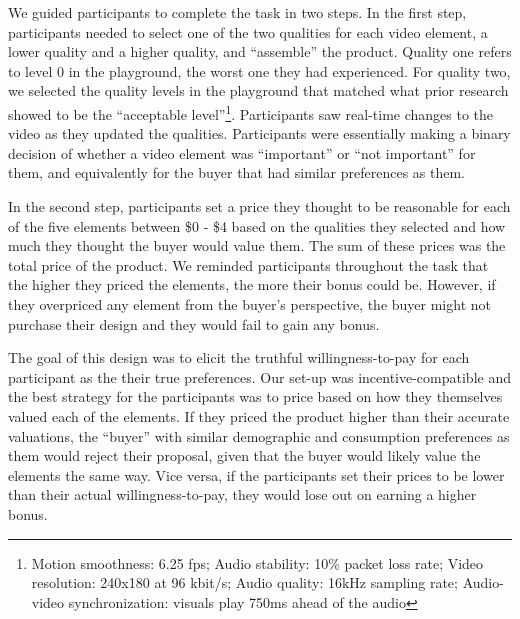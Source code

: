 We guided participants to complete the task in two steps.  In the first step, participants needed to select one of the two qualities for each video element, a lower quality and a higher quality, and ``assemble'' the product. Quality one refers to level 0 in the playground, the worst one they had experienced. For quality two, we selected the quality levels in the playground that matched what prior research showed to be the ``acceptable level''\footnote{Motion smoothness: 6.25 fps; Audio stability: 10\% packet loss rate; Video resolution: 240x180 at 96 kbit/s; Audio quality: 16kHz sampling rate; Audio-video synchronization: visuals play 750ms ahead of the audio}. Participants saw real-time changes to the video as they updated the qualities. Participants were essentially making a binary decision of whether a video element was ``important'' or ``not important'' for them, and equivalently for the buyer that had similar preferences as them. 

In the second step, participants set a price they thought to be reasonable for each of the five elements between \$0 - \$4 based on the qualities they selected and how much they thought the buyer would value them. The sum of these prices was the total price of the product. We reminded participants throughout the task that the higher they priced the elements, the more their bonus could be. However, if they overpriced any element from the buyer's perspective, the buyer might not purchase their design and they would fail to gain any bonus. 

The goal of this design was to elicit the truthful willingness-to-pay for each participant as the their true preferences. Our set-up was incentive-compatible and the best strategy for the participants was to price based on how they themselves valued each of the elements. If they priced the product higher than their accurate valuations, the ``buyer'' with similar demographic and consumption preferences as them would reject their proposal, given that the buyer would likely value the elements the same way. Vice versa, if the participants set their prices to be lower than their actual willingness-to-pay, they would lose out on earning a higher bonus.


